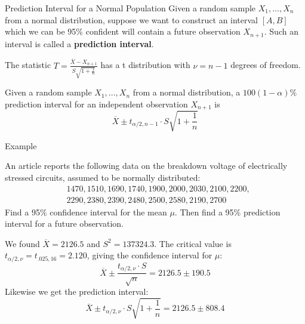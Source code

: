 \documentclass[handout]{beamer}
\renewcommand{\emph}{\textbf}
\begin{document}
\begin{frame}{Prediction Interval for a Normal Population}
Given a random sample $X_1,\dots,X_n$ from a normal distribution, suppose we want to construct an interval $[A,B]$ which we can be 95\% confident will contain a future observation $X_{n+1}$. Such an interval is called a \emph{prediction interval}.

\vspace{.2cm}\pause The statistic $T=\frac{\overline X-X_{n+1}}{S\sqrt{1+\frac1n}}$ has a t distribution with $\nu=n-1$ degrees of freedom.
\begin{block}{}
Given a random sample $X_1,\dots,X_n$ from a normal distribution, a $100(1-\alpha)\%$ prediction interval for an independent observation $X_{n+1}$ is
$$\overline X \pm t_{\alpha/2,n-1}\cdot S\sqrt{1+\frac1n}$$
\end{block}
\end{frame}

\begin{frame}{Example}
\begin{block}{}
An article reports the following data on the breakdown voltage of electrically stressed circuits, assumed to be normally distributed:
\begin{align*}
&1470, 1510, 1690, 1740, 1900, 2000, 2030, 2100, 2200, \\
& 2290, 2380, 2390, 2480, 2500, 2580, 2190, 2700
\end{align*}
Find a 95\% confidence interval for the mean $\mu$. Then find a 95\% prediction interval for a future observation.
\end{block}

We found $\overline X=2126.5$ and $S^2=137324.3$.
The critical value is $t_{\alpha/2,\nu}=t_{.025,16}=2.120$, giving the confidence interval for $\mu$:
$$\overline{X} \pm \frac{t_{\alpha/2,\nu}\cdot S}{\sqrt{n}} = 2126.5 \pm 190.5$$
Likewise we get the prediction interval:
$$\overline X \pm t_{\alpha/2,\nu}\cdot S\sqrt{1+\frac1n} = 2126.5 \pm 808.4$$
\end{frame}
\end{document}
